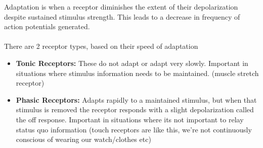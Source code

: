 \documentclass[11pt]{article}
\begin{document}
Adaptation is when a receptor diminishes the extent of their depolarization despite sustained stimulus strength. This leads to a decrease in frequency of action potentials generated. 
\\ \\
There are 2 receptor types, based on their speed of adaptation
\begin{itemize}
\item \textbf{Tonic Receptors:} These do not adapt or adapt very slowly. Important in situations where stimulus information needs to be maintained. (muscle stretch receptor)
\item \textbf{Phasic Receptors:} Adapts rapidly to a maintained stimulus, but when that stimulus is removed the receptor responds with a slight depolarization called the off response. Important in situations where its not important to relay status quo information (touch receptors are like this, we’re not continuously conscious of wearing our watch/clothes etc)
\end{itemize}
 
\end{document}
